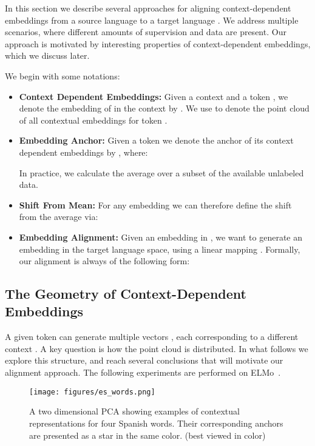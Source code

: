\documentclass[11pt,a4paper]{article}
\begin{document}
In this section we describe several approaches for aligning context-dependent embeddings from a source language  to a target language . We address multiple scenarios, where different amounts of supervision and data are present.
Our approach is motivated by interesting properties of context-dependent embeddings, which we discuss later.

We begin with some notations:
\begin{itemize}
\item {\bf Context Dependent Embeddings:} Given a context  and a token , we denote the embedding of  in the context  by . We use  to denote the point cloud of all contextual embeddings for token .\item {\bf Embedding Anchor:}
Given a token  we denote the anchor of its context dependent embeddings by , where:

In practice, we calculate the average over a subset of the available unlabeled data.
\item {\bf Shift From Mean:}
For any embedding  we can therefore define the shift  from the average via:
 

\item {\bf Embedding Alignment:} Given an embedding  in , we want to generate an embedding  in the target language space, using a linear mapping . Formally, our alignment is always of the following form:





\end{itemize}



\subsection{The Geometry of Context-Dependent Embeddings \label{sec:geometry}}
A given token  can generate multiple vectors , each corresponding to a different context .
A key question is how the point cloud   is distributed. In what follows we explore this structure, and reach several conclusions that will motivate our alignment approach. The following experiments are performed on ELMo~\cite{peters_deep_2018}.


\begin{figure}[t!]
    \centering
  \texttt{[image: figures/es\_words.png]}

    \caption{A two dimensional PCA showing examples of contextual representations for four Spanish words. Their corresponding anchors are presented as a star in the same color. (best viewed in color)} \label{fig:emb_spaces}
\end{figure}
\end{document}
